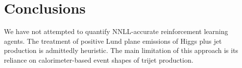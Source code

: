 \section{Conclusions}\label{sec:conclusions}

We have not attempted to quantify NNLL-accurate reinforcement learning
agents. The treatment of positive Lund plane emissions of Higgs plus jet
production is admittedly heuristic. The main limitation of this approach
is its reliance on calorimeter-based event shapes of trijet production.

